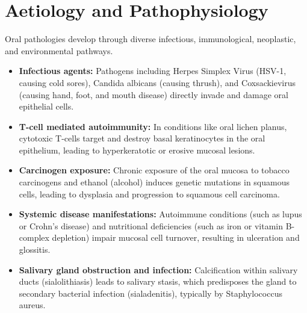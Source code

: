 \section*{Aetiology and Pathophysiology}
Oral pathologies develop through diverse infectious, immunological, neoplastic, and environmental pathways.
\begin{itemize}
    \item \textbf{Infectious agents:} Pathogens including Herpes Simplex Virus (HSV-1, causing cold sores), Candida albicans (causing thrush), and Coxsackievirus (causing hand, foot, and mouth disease) directly invade and damage oral epithelial cells.
    \item \textbf{T-cell mediated autoimmunity:} In conditions like oral lichen planus, cytotoxic T-cells target and destroy basal keratinocytes in the oral epithelium, leading to hyperkeratotic or erosive mucosal lesions.
    \item \textbf{Carcinogen exposure:} Chronic exposure of the oral mucosa to tobacco carcinogens and ethanol (alcohol) induces genetic mutations in squamous cells, leading to dysplasia and progression to squamous cell carcinoma.
    \item \textbf{Systemic disease manifestations:} Autoimmune conditions (such as lupus or Crohn's disease) and nutritional deficiencies (such as iron or vitamin B-complex depletion) impair mucosal cell turnover, resulting in ulceration and glossitis.
    \item \textbf{Salivary gland obstruction and infection:} Calcification within salivary ducts (sialolithiasis) leads to salivary stasis, which predisposes the gland to secondary bacterial infection (sialadenitis), typically by Staphylococcus aureus.
\end{itemize}

